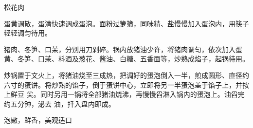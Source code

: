 \begin{recipe}{松花肉}

\ingredients


\preparation

\step 蛋黄调散，蛋清快速调成蛋泡。面粉过箩筛，同味精、盐慢慢加入蛋泡内，用筷子
轻轻调匀待用。

\step 猪肉、冬笋、口茉，分别用刀剁碎。锅内放猪油少许，将猪肉调匀，依次加入蛋
黄、冬笋、口茉、料酒及葱花、酱油、白糖、五香面等，炒熟成焰子，起锅待用。

\step 炒锅置于文火上，将猪油烧至三成热，把调好的蛋泡倒入一半，煎成圆形、直径约
六寸的蛋饼。将炒熟的馅子，倒于蛋饼中心，立即将另一半蛋泡盖于馅子上，并按上鲜豆
尖。同时另用一锅将全部猪油烧沸，再慢慢舀淋入锅内的蛋泡上。油舀完约五分钟，泌去
油，扦入盘内即成。

\features

泡嫩，鲜香，美观适口

\end{recipe}

